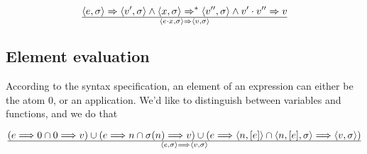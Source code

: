 \begin{equation}
{
  \left\langle e,\sigma\right\rangle
  \Rightarrow
  \left\langle v',\sigma\right\rangle
\wedge
  \left\langle x,\sigma\right\rangle
  \Rightarrow^*
  \left\langle v'',\sigma\right\rangle
\wedge
  v'\cdot v'' \Rightarrow v
}\over{
\left\langle e\cdot x, \sigma\right\rangle
\Rightarrow
\left\langle v,\sigma\right\rangle
}
\end{equation}


\subsection{Element evaluation}

According to the syntax specification, an element of an expression can either be the atom $0$, or an application. We'd like to distinguish between variables and functions, and we do that  

\begin{equation}
{
\left(e\Longrightarrow 0\cap 0\Longrightarrow v\right)
\cup
\left(e\Longrightarrow n\cap \sigma(n)\Longrightarrow v\right)
\cup
\left(e\Longrightarrow \left\langle n, [e]\right\rangle\cap \left\langle
n,[e],\sigma\right\rangle \Longrightarrow \left\langle v,
\sigma\right\rangle\right)
}\over{
\left\langle e,\sigma\right\rangle
\Longrightarrow
\left\langle v,\sigma\right\rangle
}
\end{equation}
